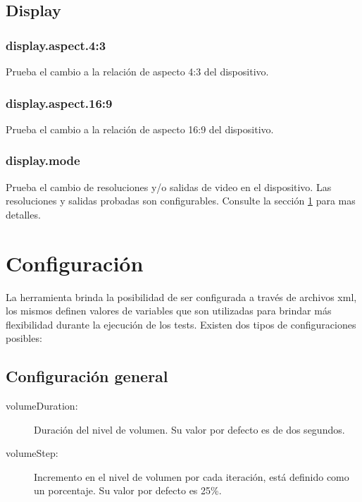 \documentclass{article}
\begin{document}
\FloatBarrier

\subsection{Display}
\label{sec:display_test}

\FloatBarrier

\subsubsection{display.aspect.4:3}
Prueba el cambio a la relación de aspecto 4:3 del dispositivo.

\FloatBarrier

\subsubsection{display.aspect.16:9}
Prueba el cambio a la relación de aspecto 16:9 del dispositivo.

\FloatBarrier

\subsubsection{display.mode}
Prueba el cambio de resoluciones y/o salidas de video en el dispositivo. Las resoluciones y salidas probadas son configurables. Consulte la sección \ref{sec:conf} para mas detalles.

\FloatBarrier

\section{Configuración}
\label{sec:conf}
La herramienta brinda la posibilidad de ser configurada a través de archivos xml, los mismos definen valores de variables que son utilizadas para brindar más flexibilidad durante la ejecución de los tests. Existen dos tipos de configuraciones posibles:

\subsection{Configuración general}

\begin{description}
  \item[volumeDuration:] Duración del nivel de volumen. Su valor por defecto es de dos segundos.
  \item[volumeStep:] Incremento en el nivel de volumen por cada iteración, está definido como un porcentaje. Su valor por defecto es 25\%.
\end{description}
\end{document}
